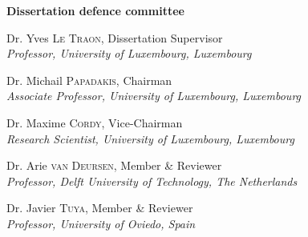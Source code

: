 \begin{adjustwidth*}{1em}{1em}

\noindent
\textbf{\large Dissertation defence committee}

\vspace{0.5cm}
\noindent
Dr. Yves \textsc{Le Traon}, Dissertation Supervisor\\
{\small \emph{Professor, University of Luxembourg, Luxembourg}}

\vspace{0.3cm}
\noindent
Dr. Michail \textsc{Papadakis}, Chairman\\
{\small \emph{Associate Professor, University of Luxembourg, Luxembourg}}   

\vspace{0.3cm}
\noindent
Dr.  Maxime \textsc{Cordy}, Vice-Chairman\\
{\small \emph{Research Scientist, University of Luxembourg, Luxembourg}} 

\vspace{0.3cm}
\noindent
Dr. Arie \textsc{van Deursen}, Member \& Reviewer\\
{\small \emph{Professor, Delft University of Technology, The Netherlands}}

\vspace{0.3cm}
\noindent
Dr. Javier \textsc{Tuya}, Member \& Reviewer\\
{\small \emph{Professor, University of Oviedo, Spain}}

\end{adjustwidth*}

\restoregeometry